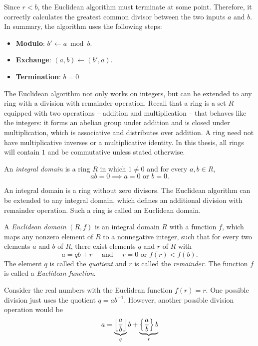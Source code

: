 Since $r < b$, the Euclidean algorithm must terminate at some point.
Therefore, it correctly calculates the greatest common divisor between the two
inputs $a$ and $b$.
In summary, the algorithm uses the following steps:
\begin{itemize}
  \item \textbf{Modulo}: $b' ← a \bmod b$.
  \item \textbf{Exchange}: $(a, b) ← (b', a)$.
  \item \textbf{Termination}: $b = 0$
\end{itemize}

The Euclidean algorithm not only works on integers,
but can be extended to any ring with a division with remainder operation.
Recall that a ring is a set $R$ equipped with two operations -- addition and
multiplication -- that behaves like the integers:
it forms an abelian group under addition and is closed under multiplication,
which is associative and distributes over addition.
A ring need not have multiplicative inverses or a multiplicative identity.
In this thesis, all rings will contain $1$ and be commutative unless stated
otherwise.

\begin{definition}
  An \emph{integral domain} is a ring $R$ in which $1 ≠ 0$ and for every $a, b ∈ R$,
  \[
    ab = 0 \implies a = 0 \text{ or } b = 0.
  \]
\end{definition}

An integral domain is a ring without zero divisors.
The Euclidean algorithm can be extended to any integral domain,
which defines an additional division with remainder operation.
Such a ring is called an Euclidean domain.

\begin{definition}
  A \emph{Euclidean domain} $(R, f)$ is an integral domain $R$ with a function $f$,
  which maps any nonzero element of $R$ to a nonnegative integer,
  such that for every two elements $a$ and $b$ of $R$, there exist elements $q$ and $r$ of $R$ with
  \[
    a = qb + r \quad \text{ and } \quad r = 0 \text{ or } f(r) < f(b).
  \]
  The element $q$ is called the \emph{quotient} and $r$ is called the \emph{remainder}.
  The function $f$ is called a \emph{Euclidean function}.
\end{definition}

\begin{example}
  Consider the real numbers with the Euclidean function $f(r) = r$.
  One possible division just uses the quotient $q = ab^{-1}$.
  However,
  another possible division operation would be
  \[
    a = \underbrace{\left\lfloor\frac{a}{b}\right\rfloor}_q b + \underbrace{\left\{ \frac{a}{b} \right\} b}_r
  \]
\end{example}

